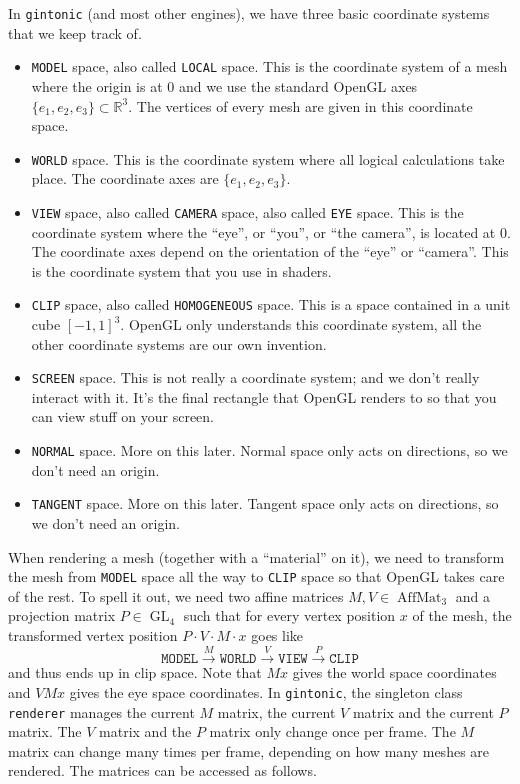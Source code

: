\documentclass{article}
\DeclareMathOperator{\AffMat}{AffMat}
\DeclareMathOperator{\GL}{GL}
\begin{document}
In \texttt{gintonic} (and most other engines), we have three basic coordinate systems that we keep track of.

\begin{itemize}
\item \texttt{MODEL} space, also called \texttt{LOCAL} space. This is the coordinate system of a mesh where the origin is at $0$ and we use the standard OpenGL axes $\{e_1,e_2,e_3\} \subset \mathbb{R}^3$. The vertices of every mesh are given in this coordinate space.

\item \texttt{WORLD} space. This is the coordinate system where all logical calculations take place. The coordinate axes are $\{e_1,e_2,e_3\}$.

\item \texttt{VIEW} space, also called \texttt{CAMERA} space, also called \texttt{EYE} space. This is the coordinate system where the ``eye'', or ``you'', or ``the camera'', is located at $0$. The coordinate axes depend on the orientation of the ``eye'' or ``camera''. This is the coordinate system that you use in shaders.

\item \texttt{CLIP} space, also called \texttt{HOMOGENEOUS} space. This is a space contained in a unit cube $[-1,1]^3$. OpenGL only understands this coordinate system, all the other coordinate systems are our own invention.

\item \texttt{SCREEN} space. This is not really a coordinate system; and we don't really interact with it. It's the final rectangle that OpenGL renders to so that you can view stuff on your screen.

\item \texttt{NORMAL} space. More on this later. Normal space only acts on directions, so we don't need an origin.

\item \texttt{TANGENT} space. More on this later. Tangent space only acts on directions, so we don't need an origin.
\end{itemize}

When rendering a mesh (together with a ``material'' on it), we need to transform the mesh from \texttt{MODEL} space all the way to \texttt{CLIP} space so that OpenGL takes care of the rest. To spell it out, we need two affine matrices $M,V \in \AffMat_3$ and a projection matrix $P \in \GL_4$ such that for every vertex position $x$ of the mesh, the transformed vertex position $P\cdot V \cdot M \cdot x$ goes like
\[ \texttt{MODEL} \xrightarrow{M} \texttt{WORLD} \xrightarrow{V} \texttt{VIEW} \xrightarrow{P} \texttt{CLIP} \]
and thus ends up in clip space. Note that $Mx$ gives the world space coordinates and $VMx$ gives the eye space coordinates.
In \texttt{gintonic}, the singleton class \texttt{renderer} manages the current $M$ matrix, the current $V$ matrix and the current $P$ matrix. The $V$ matrix and the $P$ matrix only change once per frame. The $M$ matrix can change many times per frame, depending on how many meshes are rendered. The matrices can be accessed as follows.
\end{document}
